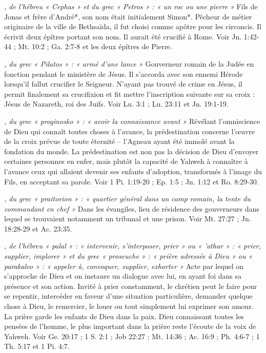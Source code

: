 \begin{multicols}{2}
{\textit{, de l'hébreu « Cephas » et du grec « Petros » : « un roc ou une pierre »}\newline
Fils de Jonas et frère d'André*, son nom était initialement Simon*. Pêcheur de métier originaire de la ville de Bethsaïda, il fut choisi comme apôtre pour les circoncis. Il écrivit deux épîtres portant son nom. Il aurait été crucifié à Rome. Voir Jn. 1:42-44 ; Mt. 10:2 ; Ga. 2:7-8 et les deux épîtres de Pierre.

\textit{, du grec « Pilatos » : « armé d'une lance »}\newline
Gouverneur romain de la Judée en fonction pendant le ministère de Jésus. Il s'accorda avec son ennemi Hérode lorsqu'il fallut crucifier le Seigneur. N'ayant pas trouvé de crime en Jésus, il permit finalement sa crucifixion et fit mettre l'inscription suivante sur sa croix : Jésus de Nazareth, roi des Juifs. Voir Lu. 3:1 ; Lu. 23:11 et Jn. 19:1-19.

\textit{, du grec « proginosko » : « avoir la connaissance avant »}\newline
Révélant l'omniscience de Dieu qui connaît toutes choses à l'avance, la prédestination concerne l'œuvre de la croix prévue de toute éternité – l'Agneau ayant été immolé avant la fondation du monde. La prédestination est non pas la décision de Dieu d'envoyer certaines personnes en enfer, mais plutôt la capacité de Yahweh à connaître à l'avance ceux qui allaient devenir ses enfants d'adoption, transformés à l'image du Fils, en acceptant sa parole. Voir 1 Pi. 1:19-20 ; Ep. 1:5 ; Jn. 1:12 et Ro. 8:29-30.

\textit{, du grec « praitorion » : « quartier général dans un camp romain, la tente du commandant en chef »}\newline
Dans les évangiles, lieu de résidence des gouverneurs dans lequel se trouvaient notamment un tribunal et une prison. Voir Mt. 27:27 ; Jn. 18:28-29 et Ac. 23:35.

\textit{, de l'hébreu « palal » : « intervenir, s'interposer, prier » ou « 'athar » : « prier, supplier, implorer » et du grec « proseuche » : « prière adressée à Dieu » ou « parakaleo » : « appeler à, convoquer, supplier, exhorter »}\newline
Acte par lequel on s'approche de Dieu et on instaure un dialogue avec lui, en ayant foi dans sa présence et son action. Invité à prier constamment, le chrétien peut le faire pour se repentir, intercéder en faveur d'une situation particulière, demander quelque chose à Dieu, le remercier, le louer ou tout simplement lui exprimer son amour. La prière garde les enfants de Dieu dans la paix. Dieu connaissant toutes les pensées de l'homme, le plus important dans la prière reste l'écoute de la voix de Yahweh. Voir Ge. 20:17 ; 1 S. 2:1 ; Job 22:27 ; Mt. 14:36 ; Ac. 16:9 ; Ph. 4:6-7 ; 1 Th. 5:17 et 1 Pi. 4:7.

}
\end{multicols}
